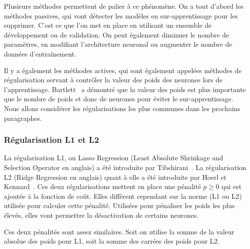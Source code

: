 Plusieurs méthodes permettent de palier à ce phénomène. On a tout d'abord les méthodes passives, qui vont détecter les modèles en sur-apprentissage pour les supprimer. C'est ce que l'on met en place en utilisant un ensemble de développement ou de validation. On peut également diminuer le nombre de paramètres, en modifiant l'architecture neuronal ou augmenter le nombre de données d’entraînement.

Il y a également les méthodes actives, qui sont également appelées méthodes de régularisation servant à contrôler la valeur des poids des neurones lors de l'apprentissage. Bartlett~\cite{Bartlett1997} a démontré que la valeur des poids est plus importante que le nombre de poids et donc de neurones pour éviter le sur-apprentissage. Nous allons considérer les régularisations les plus communes dans les prochains paragraphes.

\subsubsection{Régularisation L1 et L2}

La régularisation L1, ou Lasso Regression (Least Absolute Shrinkage and Selection Operator en anglais) a été introduite par Tibshirani~\cite{Tibshirani1996}. La régularisation L2 (Ridge Regression en anglais) quant à elle a été introduite par Hoerl et Kennard~\cite{Hoerl1970}. Ces deux régularisations mettent en place une pénalité $p\geq 0$ qui est ajoutée à la fonction de coût. Elles diffèrent cependant sur la norme (L1 ou L2)%
utilisée pour calculer cette pénalité. Utilisées pour pénaliser les poids les plus élevés, elles vont permettre la désactivation de certains neurones. %

%

Ces deux pénalités sont assez similaires. Soit on utilise la somme de la valeur absolue des poids pour L1, soit la somme des carrées des poids pour L2. %

